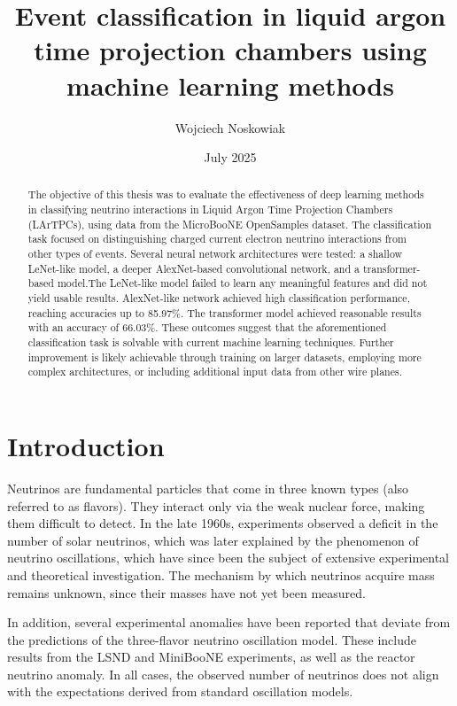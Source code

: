 \documentclass{pracalicmgr}
\author{Wojciech Noskowiak}
\title{Event classification in liquid argon time projection chambers using machine learning methods}
\date{July 2025}
\begin{document}
\maketitle
\let\cleardoublepage\clearpage

\begin{abstract}
The objective of this thesis was to evaluate the effectiveness of deep learning methods in classifying neutrino interactions in Liquid Argon Time Projection Chambers (LArTPCs), using data from the MicroBooNE OpenSamples dataset. The classification task focused on distinguishing charged current electron neutrino interactions from other types of events. Several neural network architectures were tested: a shallow LeNet-like model, a deeper AlexNet-based convolutional network, and a transformer-based model.The LeNet-like model failed to learn any meaningful features and did not yield usable results. AlexNet-like network achieved high classification performance, reaching accuracies up to 85.97\%. The transformer model achieved reasonable results with an accuracy of 66.03\%. These outcomes suggest that the aforementioned classification task is solvable with current machine learning techniques. Further improvement is likely achievable through training on larger datasets, employing more complex architectures, or including additional input data from other wire planes.

\end{abstract}

\tableofcontents

\chapter*{Introduction}

Neutrinos are fundamental particles that come in three known types (also referred to as flavors). They interact only via the weak nuclear force, making them difficult to detect. In the late 1960s, experiments observed a deficit in the number of solar neutrinos, which was later explained by the phenomenon of neutrino oscillations, which have since been the subject of extensive experimental and theoretical investigation\cite{NeutrionoOscillationsHistory}. The mechanism by which neutrinos acquire mass remains unknown, since their masses have not yet been measured.

In addition, several experimental anomalies have been reported that deviate from the predictions of the three-flavor neutrino oscillation model. These include results from the LSND and MiniBooNE experiments, as well as the reactor neutrino anomaly. In all cases, the observed number of neutrinos does not align with the expectations derived from standard oscillation models\cite{neutrinoAnomally}.
\end{document}
